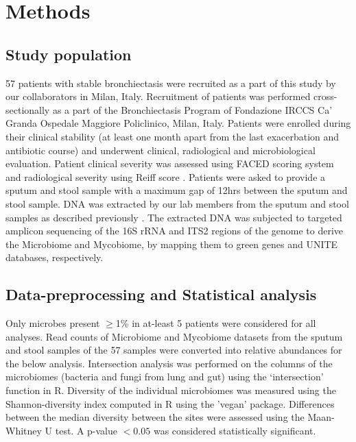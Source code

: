 \section{Methods}

\subsection{Study population}
57 patients with stable bronchiectasis were recruited as a part of this study by our collaborators in Milan, Italy. Recruitment of patients was performed cross-sectionally as a part of the Bronchiectasis Program of Fondazione IRCCS Ca' Granda Ospedale Maggiore Policlinico, Milan, Italy. Patients were enrolled during their clinical stability (at least one month apart from the last exacerbation and antibiotic course) and underwent clinical, radiological and microbiological evaluation. Patient clinical severity was assessed using FACED scoring system \cite{RosaCarrillo2018} and radiological severity using Reiff score \cite{Reiff1995}. Patients were asked to provide a sputum and stool sample with a maximum gap of 12hrs between the sputum and stool sample. DNA was extracted by our lab members from the sputum and stool samples as described previously \cite{Mac1800766}. The extracted DNA was subjected to targeted amplicon sequencing of the 16S rRNA and ITS2 regions of the genome to derive the Microbiome and Mycobiome, by mapping them to green genes and UNITE databases, respectively.

\subsection{Data-preprocessing and Statistical analysis}

Only microbes present $\geq$1\% in at-least 5 patients were considered for all analyses. Read counts of Microbiome and Mycobiome datasets from the sputum and stool samples of the 57 samples were converted into relative abundances for the below analysis. Intersection analysis was performed on the columns of the microbiomes (bacteria and fungi from lung and gut) using the `intersection' function in R. Diversity of the individual microbiomes was measured using the Shannon-diversity index computed in R using the 'vegan' package. Differences between the median diversity between the sites were assessed using the Maan-Whitney U test. A p-value $< 0.05$ was considered statistically significant.


